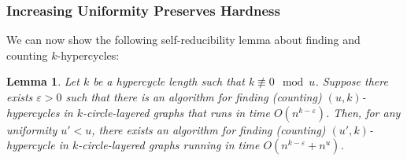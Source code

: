 \documentclass[11pt,letterpaper,pdftex]{article}
\newtheorem{lemma}[theorem]{Lemma}
\begin{document}
\subsubsection{Increasing Uniformity Preserves Hardness}

We can now show the following self-reducibility lemma about finding and counting $k$-hypercycles:

\begin{lemma} \label{lem:uniform self reduction}
    Let $k$ be a hypercycle length such that $k \not \equiv 0 \mod{u}$.
    Suppose there exists $\varepsilon>0$ such that there is an algorithm for finding (counting) $(u,k)$-hypercycles in $k$-circle-layered graphs that runs in time $O(n^{k-\varepsilon})$.
    Then, for any uniformity $u'<u$, there exists an algorithm for finding (counting) $(u',k)$-hypercycle in $k$-circle-layered graphs running in time $O(n^{k-\varepsilon}+n^u)$.
\end{lemma}
\end{document}
